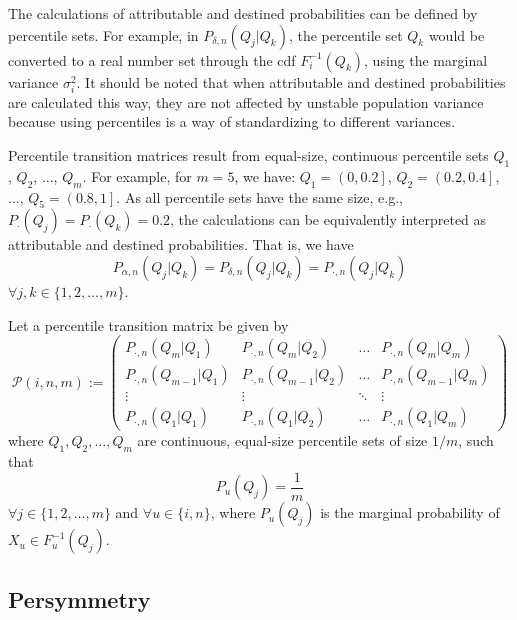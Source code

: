\documentclass{svproc} %
\begin{document}
The calculations of attributable and destined probabilities can be defined by percentile sets. For example, in $P_{\delta , n}(Q_j | Q_k)$, the percentile set $Q_k$ would be converted to a real number set through the cdf $F_i^{-1}(Q_k)$, using the marginal variance $\sigma_i^2$. It should be noted that when attributable and destined probabilities are calculated this way, they are not affected by unstable population variance because using percentiles is a way of standardizing to different variances. 

Percentile transition matrices result from equal-size, continuous percentile sets $Q_1$, $Q_2$, ..., $Q_m$. For example, for $m=5$, we have: $Q_1 = \left(0, 0.2\right]$, $Q_2 = \left(0.2, 0.4\right]$, ..., $Q_5 = \left(0.8, 1\right]$. As all percentile sets have the same size, e.g., $P_{\cdot}(Q_j) = P_{\cdot}(Q_k) = 0.2$, the calculations can be equivalently interpreted as attributable and destined probabilities. That is, we have 
\begin{equation}
P_{\alpha , n}(Q_j | Q_k) = P_{\delta , n}(Q_j | Q_k) = P_{\cdot , n}(Q_j | Q_k)
\label{eq:ad_eq}
\end{equation}
$\forall j, k \in \{1, 2, \dots , m\}$.


\begin{definition}
Let a percentile transition matrix be given by 
\begin{equation}
\mathcal{P}(i, n, m) := 
\begin{pmatrix}
P_{\cdot , n}(Q_m | Q_1) &  P_{\cdot , n}(Q_m | Q_2)  & \ldots & P_{\cdot , n}(Q_m | Q_m)\\
P_{\cdot , n}(Q_{m-1} | Q_1)  &  P_{\cdot , n}(Q_{m-1} | Q_2) & \ldots & P_{\cdot , n}(Q_{m-1} | Q_m)\\
\vdots & \vdots & \ddots & \vdots\\
P_{\cdot , n}(Q_1 | Q_1)  &   P_{\cdot , n}(Q_1 | Q_2)       &\ldots & P_{\cdot , n}(Q_1 | Q_m) 
\end{pmatrix}
\label{eq:ptm}
\end{equation}
where $Q_1, Q_2, \dots , Q_m$ are continuous, equal-size percentile sets of size $1/m$, such that 
\begin{equation}
P_u(Q_j) = \frac{1}{m}
\label{eq:size}
\end{equation}
$\forall j \in \{1, 2, \dots , m\}$ and $\forall u \in \{i, n\}$, where $P_u(Q_j)$ is the marginal probability of $X_u \in F_u^{-1}(Q_j)$.
\label{def:ptm}
\end{definition}

 
\subsection{Persymmetry} 
\end{document}
